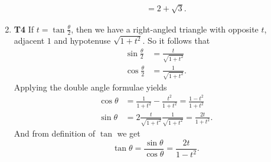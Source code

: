 \documentclass[12pt,oneside]{book}
\begin{document}
\begin{enumerate}
\begin{enumerate}
\begin{align*}
                &= 2 + \sqrt{3} .
            \end{align*}
        \end{enumerate}
        \item \textbf{T4} If $t = \tan \frac{\theta}{2}$, then we have a right-angled triangle with opposite $t$, adjacent $1$ and hypotenuse $\sqrt{1+t^2}$. So it follows that \begin{align*}
            \sin \frac{\theta}{2} &= \frac{t}{\sqrt{1 + t^2}} \\
            \cos \frac{\theta}{2} &= \frac{1}{\sqrt{1 + t^2}}.
        \end{align*} Applying the double angle formulae yields \begin{align*}
            \cos \theta &= \frac{1}{1+t^2} - \frac{t^2}{1+t^2} = \frac{1-t^2}{1+t^2}\\
            \sin \theta &= 2 \frac{t}{\sqrt{1 + t^2}} \frac{1}{\sqrt{1+t^2}} = \frac{2t}{1+t^2}.
        \end{align*} And from definition of $\tan$ we get \[
            \tan \theta = \frac{\sin \theta}{\cos \theta} = \frac{2t}{1-t^2}
        .\] 


\end{enumerate}
\end{document}
